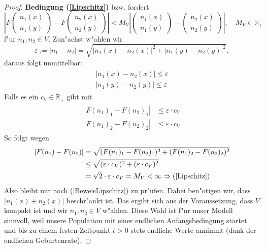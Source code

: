 \documentclass[11pt, a4paper, german]{article}
\theoremstyle{plain}
\newcommand{\eps}{\ensuremath{\varepsilon}}
\newcommand{\tvec}[2]{\begin{pmatrix}#1\\#2\end{pmatrix}}
\begin{document}
\begin{proof}
		\textbf{Bedingung (\ref{Lipschitz})} bzw. \cite[Kapitel 11 - \textbf{Thm 2.1} (2.7)]{ethier2009markov} fordert
		\[ \left| F\tvec{n_1(x)}{n_1(y)} - F\tvec{n_2(x)}{n_2(y)} \right| < M_V \left| \tvec{n_1(x)}{n_1(y)} - \tvec{n_2(x)}{n_2(y)} \right|, \quad M_V \in \mathbb{R}_{+} \]
		f"ur $ n_1, n_2 \in V $. 
		Zun"achst w"ahlen wir
		\[ \eps := |n_1 - n_2| = \sqrt{|n_1(x) - n_2(x)|^2 + |n_1(y) - n_2(y)|^2}, \]
		daraus folgt unmittelbar:
		\begin{align}
		\begin{split}
			|n_1(x) - n_2(x)| \le \eps\\
			|n_1(y) - n_2(y)| \le \eps \label{epsAbsch}
		\end{split}
		\end{align}
		Falls es ein $ c_V \in \mathbb{R}_{+} $ gibt mit
		\begin{align}
		\begin{split}
			|F(n_1)_1 - F(n_2)_1| &\le \eps \cdot c_V\\
			|F(n_1)_2 - F(n_2)_2| &\le \eps \cdot c_V \label{BeweisLipschitz}
		\end{split}
		\end{align}
		So folgt wegen 
		\begin{align}
		\begin{split}
			|F(n_1) - F(n_2)| &= \sqrt{(F(n_1)_1 - F(n_2)_1)^2 + (F(n_1)_2 - F(n_2)_2)^2}\\
			&\le \sqrt{(\eps \cdot c_V)^2 + (\eps \cdot c_V)^2}\\
			&= \sqrt{2} \cdot \eps \cdot c_V = M_V < \infty \Rightarrow (\ref{Lipschitz})
			\label{epsBehauptung}
		\end{split}
		\end{align}
		Also bleibt nur noch (\ref{BeweisLipschitz}) zu pr"ufen. Dabei ben"otigen wir, dass $ |n_1(x) + n_2(x)| $ beschr"ankt ist. Das ergibt sich aus der Voraussetzung, dass $ V $ kompakt ist und wir $ n_1, n_2 \in V $ w"ahlen. Diese Wahl ist f"ur unser Modell sinnvoll, weil unsere Population mit einer endlichen Anfangsbedingung startet und bis zu einem festen Zeitpunkt $ t > 0 $ stets endliche Werte annimmt (dank der endlichen Geburtenrate).
		

\end{proof}
\end{document}
